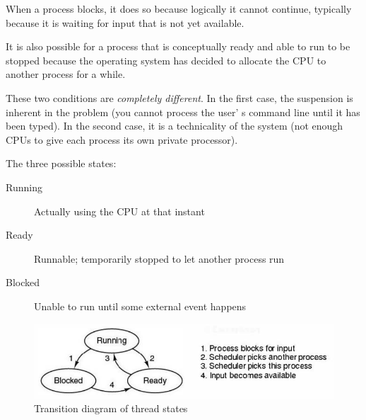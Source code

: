 
When a process blocks, it does so because logically it cannot continue, typically because it is waiting for input that is not yet available.

It is also possible for a process that is conceptually ready and able to run to be stopped because the operating system has decided to allocate the CPU to another process for a while.

These two conditions are \emph{completely different}. In the first case, the suspension is inherent in the problem (you cannot process the user' s command line until it has been typed). In the second case, it is a technicality of the system (not enough CPUs to give each process its own private processor).

The three possible states:
\begin{description}
\item[Running] Actually using the CPU at that instant
\item[Ready] Runnable; temporarily stopped to let another process run
\item[Blocked] Unable to run until some external event happens
\end{description}

\begin{figure}[H]
  \centering
  \includegraphics[scale=0.5]{images/thread_life}
  \caption{Transition diagram of thread states}
\end{figure}
